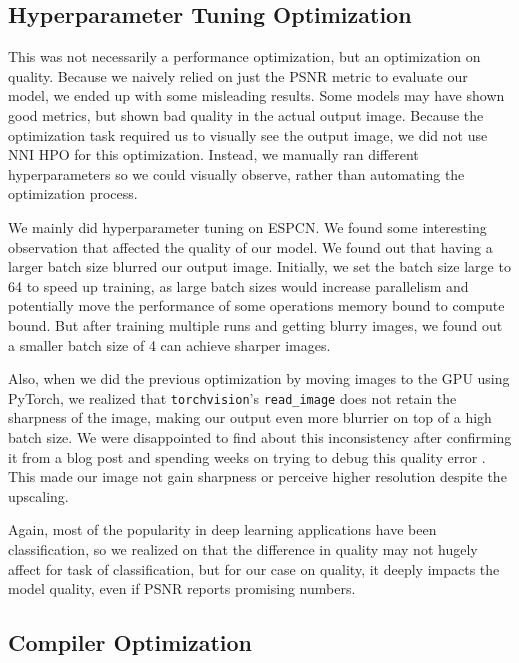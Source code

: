 \documentclass{article}
\begin{document}
\subsection{Hyperparameter Tuning Optimization}
This was not necessarily a performance optimization, but an optimization on quality. Because we naively relied on just the PSNR metric to evaluate our model, we ended up with some misleading results. Some models may have shown good metrics, but shown bad quality in the actual output image. Because the optimization task required us to visually see the output image, we did not use NNI HPO for this optimization. Instead, we manually ran different hyperparameters so we could visually observe, rather than automating the optimization process.

We mainly did hyperparameter tuning on ESPCN. We found some interesting observation that affected the quality of our model. We found out that having a larger batch size blurred our output image. Initially, we set the batch size large to 64 to speed up training, as large batch sizes would increase parallelism and potentially move the performance of some operations memory bound to compute bound. But after training multiple runs and getting blurry images, we found out a smaller batch size of 4 can achieve sharper images. 

Also, when we did the previous optimization by moving images to the GPU using PyTorch, we realized that \verb|torchvision|'s \verb|read_image| does not retain the sharpness of the image, making our output even more blurrier on top of a high batch size. We were disappointed to find about this inconsistency after confirming it from a blog post and spending weeks on trying to debug this quality error \cite{torchvision-blog}. This made our image not gain sharpness or perceive higher resolution despite the upscaling.

Again, most of the popularity in deep learning applications have been classification, so we realized on that the difference in quality may not hugely affect for task of classification, but for our case on quality, it deeply impacts the model quality, even if PSNR reports promising numbers.

\subsection{Compiler Optimization}
\end{document}
